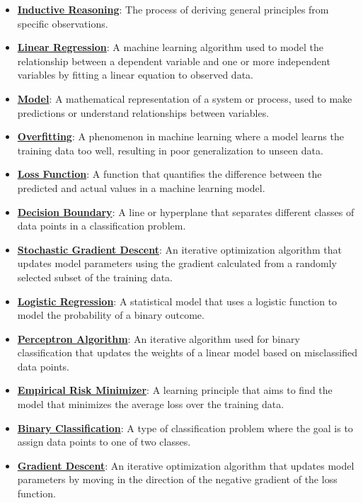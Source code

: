 \documentclass{article}%
\begin{document}
\begin{itemize}[leftmargin=*]%
\item \href{https://www.math.purdue.edu/~yipn/351/05L2-ML Basics.pdf#page=3}{\textbf{Inductive Reasoning}}: The process of deriving general principles from specific observations.%
\item \href{https://www.math.purdue.edu/~yipn/351/05L2-ML Basics.pdf#page=6}{\textbf{Linear Regression}}: A machine learning algorithm used to model the relationship between a dependent variable and one or more independent variables by fitting a linear equation to observed data.%
\item \href{https://www.math.purdue.edu/~yipn/351/05L2-ML Basics.pdf#page=5}{\textbf{Model}}: A mathematical representation of a system or process, used to make predictions or understand relationships between variables.%
\item \href{https://www.math.purdue.edu/~yipn/351/05L2-ML Basics.pdf#page=14}{\textbf{Overfitting}}: A phenomenon in machine learning where a model learns the training data too well, resulting in poor generalization to unseen data.%
\item \href{https://www.math.purdue.edu/~yipn/351/05L2-ML Basics.pdf#page=25}{\textbf{Loss Function}}: A function that quantifies the difference between the predicted and actual values in a machine learning model.%
\item \href{https://www.math.purdue.edu/~yipn/351/05L2-ML Basics.pdf#page=24}{\textbf{Decision Boundary}}: A line or hyperplane that separates different classes of data points in a classification problem.%
\item \href{https://www.math.purdue.edu/~yipn/351/05L2-ML Basics.pdf#page=29}{\textbf{Stochastic Gradient Descent}}: An iterative optimization algorithm that updates model parameters using the gradient calculated from a randomly selected subset of the training data.%
\item \href{https://www.math.purdue.edu/~yipn/351/05L2-ML Basics.pdf#page=31}{\textbf{Logistic Regression}}: A statistical model that uses a logistic function to model the probability of a binary outcome.%
\item \href{https://www.math.purdue.edu/~yipn/351/05L2-ML Basics.pdf#page=30}{\textbf{Perceptron Algorithm}}: An iterative algorithm used for binary classification that updates the weights of a linear model based on misclassified data points.%
\item \href{https://www.math.purdue.edu/~yipn/351/05L2-ML Basics.pdf#page=15}{\textbf{Empirical Risk Minimizer}}: A learning principle that aims to find the model that minimizes the average loss over the training data.%
\item \href{https://www.math.purdue.edu/~yipn/351/05L2-ML Basics.pdf#page=20}{\textbf{Binary Classification}}: A type of classification problem where the goal is to assign data points to one of two classes.%
\item \href{https://www.math.purdue.edu/~yipn/351/05L2-ML Basics.pdf#page=28}{\textbf{Gradient Descent}}: An iterative optimization algorithm that updates model parameters by moving in the direction of the negative gradient of the loss function.%
\end{itemize}%
\end{document}
